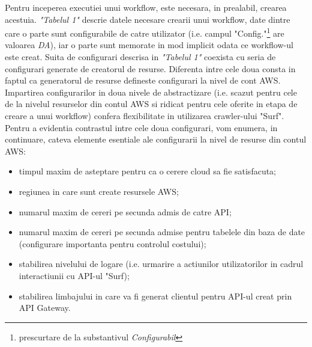 Pentru inceperea executiei unui workflow, este necesara, in prealabil, crearea acestuia. \textit{"Tabelul 1"} descrie datele necesare crearii unui workflow, date dintre care o parte sunt configurabile de catre utilizator (i.e. campul "Config."\footnote{prescurtare de la substantivul \textit{Configurabil}} are valoarea \textit{DA}), iar o parte sunt memorate in mod implicit odata ce workflow-ul este creat. Suita de configurari descrisa in \textit{"Tabelul 1"} coexista cu seria de configurari generate de creatorul de resurse. Diferenta intre cele doua consta in faptul ca generatorul de resurse defineste configurari la nivel de cont AWS. Impartirea configurarilor in doua nivele de abstractizare (i.e. scazut pentru cele de la nivelul resurselor din contul AWS si ridicat pentru cele oferite in etapa de creare a unui workflow) confera flexibilitate in utilizarea crawler-ului "Surf". Pentru a evidentia contrastul intre cele doua configurari, vom enumera, in continuare, cateva elemente esentiale ale configurarii la nivel de resurse din contul AWS:

\begin{itemize}
	\item{timpul maxim de asteptare pentru ca o cerere cloud sa fie satisfacuta;}
	\item{regiunea in care sunt create resursele AWS;}
	\item{numarul maxim de cereri pe secunda admis de catre API;}
	\item{numarul maxim de cereri pe secunda admise pentru tabelele din baza de date (configurare importanta pentru controlul costului);}
	\item{stabilirea nivelului de logare (i.e. urmarire a actiunilor utilizatorilor in cadrul interactiunii cu API-ul "Surf);}
	\item{stabilirea limbajului in care va fi generat clientul pentru API-ul creat prin API Gateway.}

\end{itemize}

